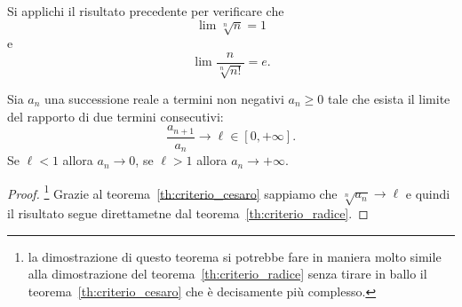 \begin{exercise}
Si applichi il risultato precedente per
verificare che
\[
   \lim \sqrt[n]{n} = 1
\]
e
\[
  \lim \frac{n}{\sqrt[n]{n!}} = e.
\]
\end{exercise}

\begin{theorem}
\label{th:criterio_rapporto}
  Sia $a_n$ una successione reale a termini non negativi
  $a_n \ge 0$ tale che esista il limite del rapporto di due termini consecutivi:
  \[
     \frac{a_{n+1}}{a_n} \to \ell \in [0,+\infty].
  \]
  Se $\ell < 1$ allora $a_n \to 0$, se $\ell >1$ allora $a_n \to +\infty$.
\end{theorem}
%
\begin{proof}\footnote{%
  la dimostrazione di questo teorema si potrebbe fare in maniera
  molto simile alla dimostrazione del teorema~\ref{th:criterio_radice}
  senza tirare in ballo il teorema~\ref{th:criterio_cesaro} che è decisamente più complesso.
  }
Grazie al teorema~\ref{th:criterio_cesaro} sappiamo
che $\sqrt[n]{a_n}\to \ell$ e quindi il risultato
segue direttametne dal teorema~\ref{th:criterio_radice}.
\end{proof}



\begin{comment}
Supponiamo sia $\ell<1$. Posto $q=(1+\ell)/2$ si ha $q < \ell < 1$ e posto $\eps=q-\ell>0$ per la definizione di limite $\frac{a_{n+1}}{a_n}\to \ell$ dovrà esistere un $N\in \NN$ tale
che per ogni $n\ge N$ si abbia:
\[
  \frac{a_{n+1}}{a_n} < \ell + \eps = q
\]
ovvero $a_{n+1} < q \cdot a_n$. In particolare si avrà:
\begin{align*}
  a_{N+1} &< q \cdot a_N \\
  a_{N+2} &< q \cdot a_{N+1} < q^2\cdot a_N \\
  a_{N+3} &< q \cdot a_{N+2} < q^3\cdot a_N \\
  \vdots
\end{align*}
ed è chiaro che per induzione potremo dimostrare che per
ogni $k\in \NN$ si ha
\[
  a_{N+k} < q^k\cdot a_N.
\]
Osserviamo però che $q^k \cdot a_N \to 0$ per $k\to +\infty$
in quanto $q<1$ e quindi $q^k \to 0$. Dunque, tolti i primi $N$ termini, la successione $a_n$ tende a zero. Ma i primi $N$ termini non influenzano né il carattere né il limite della successione e quindi l'intera successione $a_n$ tende a zero.

Il caso $\ell>1$ si fa in maniera analoga. Si sceglie $q$ tale
che $1<q<\ell$ e si trova, in maniera analoga al caso precedente,
che per un certo $N\in \NN$ e per ogni $k\in \NN$ si ha
\[
  a_{N+k} > q^k \cdot a_N \to +\infty.
\]
\end{proof}
\end{comment}

